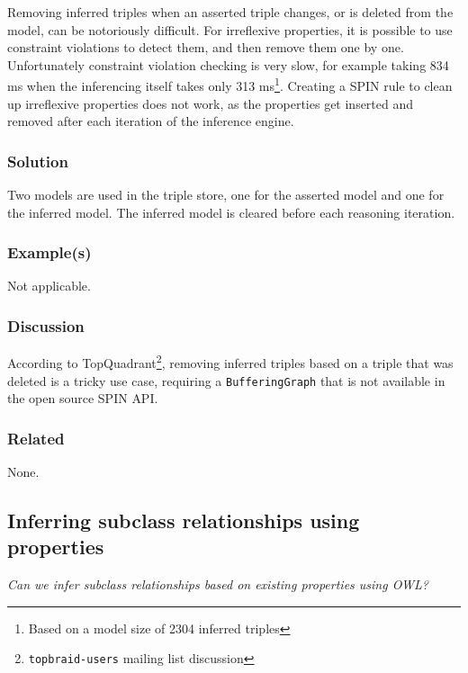 Removing inferred triples when an asserted triple changes, or is deleted from the model, can be notoriously difficult. For irreflexive properties, it is possible to use constraint violations to detect them, and then remove them one by one. Unfortunately constraint violation checking is very slow, for example taking 834 ms when the inferencing itself takes only 313 ms\footnote{Based on a model size of 2304 inferred triples}. Creating a \ac{SPIN} rule to clean up irreflexive properties does not work, as the properties get inserted and removed after each iteration of the inference engine. 

\subsubsection{Solution}

Two models are used in the triple store, one for the asserted model and one for the inferred model. The inferred model is cleared before each reasoning iteration.

\subsubsection{Example(s)}

Not applicable.

\subsubsection{Discussion}

According to TopQuadrant\footnote{\texttt{topbraid-users} mailing list discussion}, removing inferred triples based on a triple that was deleted is a tricky use case, requiring a \texttt{BufferingGraph} that is not available in the open source \ac{SPIN} \ac{API}.

\subsubsection{Related}

None.
 




\subsection{Inferring subclass relationships using properties}

\emph{Can we infer subclass relationships based on existing properties using OWL?}

